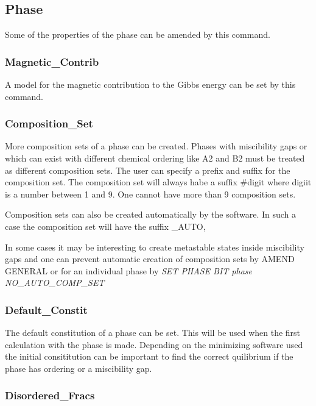 \documentclass[12pt]{article}
\begin{document}
\subsection{Phase}

Some of the properties of the phase can be amended by this command.

\subsubsection{Magnetic\_Contrib}

A model for the magnetic contribution to the Gibbs energy can be set
by this command.

\subsubsection{Composition\_Set}

More composition sets of a phase can be created.  Phases with
miscibility gaps or which can exist with different chemical ordering
like A2 and B2 must be treated as different composition sets.  The
user can specify a prefix and suffix for the composition set.  The
composition set will always habe a suffix \#digit where digiit is a
number between 1 and 9.  One cannot have more than 9 composition sets.

Composition sets can also be created automatically by the software.  In
such a case the composition set will have the suffix \_AUTO,

In some cases it may be interesting to create metastable states inside
miscibility gaps and one can prevent automatic creation of composition
sets by {\rm AMEND GENERAL} or for an individual phase by {\em SET
PHASE BIT {\em phase} NO\_AUTO\_COMP\_SET}

\subsubsection{Default\_Constit}

The default constitution of a phase can be set.  This will be used
when the first calculation with the phase is made.  Depending on the
minimizing software used the initial consititution can be important to
find the correct quilibrium if the phase has ordering or a miscibility
gap.

\subsubsection{Disordered\_Fracs}
\end{document}
